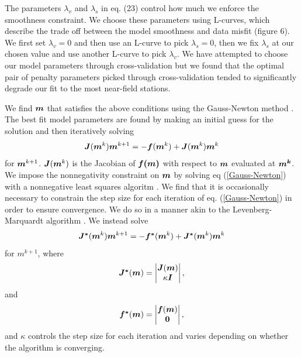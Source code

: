 \documentclass[extra]{gji}
\begin{document}
The parameters $\lambda_v$ and $\lambda_s$ in eq. (23) control how
much we enforce the smoothness constraint.  We choose these parameters
using L-curves, which describe the trade off between the model
smoothness and data misfit (figure 6).  We first set $\lambda_v=0$ and
then use an L-curve to pick $\lambda_s=0$, then we fix $\lambda_s$ at
our chosen value and use another L-curve to pick $\lambda_v$.  We have
attempted to choose our model parameters through cross-validation but
we found that the optimal pair of penalty parameters picked through
cross-validation tended to significantly degrade our fit to the most
near-field stations.

We find $\mitbf{m}$ that satisfies the above conditions using the
Gauss-Newton method \citep[e.g.][]{A2013}.  The best fit model parameters are
found by making an initial guess for the solution and then iteratively
solving
\begin{equation}\label{Gauss-Newton}
\mitbf{J}(\mitbf{m}^{k})\mitbf{m}^{k+1} = -\mitbf{f}(\mitbf{m}^k) + \mitbf{J}(\mitbf{m}^{k})\mitbf{m}^{k}
\end{equation}
for $\mitbf{m}^{k+1}$.  $\mitbf{J}(\mitbf{m}^k)$ is the Jacobian of
$\mitbf{f(m)}$ with respect to $\mitbf{m}$ evaluated at
$\mitbf{m^k}$. We impose the nonnegativity constraint on $\mitbf{m}$
by solving eq (\ref{Gauss-Newton}) with a nonnegative least squares
algoritm \citep{LH1974}. We find that it is occasionally necessary to
constrain the step size for each iteration of eq. (\ref{Gauss-Newton})
in order to ensure convergence.  We do so in a manner akin to the
Levenberg-Marquardt algorithm \citep[e.g.][]{A2013}.  We instead solve
\begin{equation}\label{Levenberg-Marquardt}
  \mitbf{J^*}(\mitbf{m}^k)\mitbf{m}^{k+1} = -\mitbf{f^*}(\mitbf{m}^k) + \mitbf{J^*}(\mitbf{m}^k)\mitbf{m}^k
\end{equation}
for $m^{k+1}$, where
\begin{equation}
  \mitbf{J^*}(\mitbf{m}) = 
      \begin{vmatrix}
      \mitbf{J}(\mitbf{m})\\
      \kappa\mitbf{I}
      \end{vmatrix},
\end{equation}
and
\begin{equation}
  \mitbf{f^*}(\mitbf{m}) = 
      \begin{vmatrix}
      \mitbf{f}(\mitbf{m})\\
      \mitbf{0}
      \end{vmatrix},
\end{equation}
and $\kappa$ controls the step size for each iteration and varies
depending on whether the algorithm is converging.  
\end{document}
